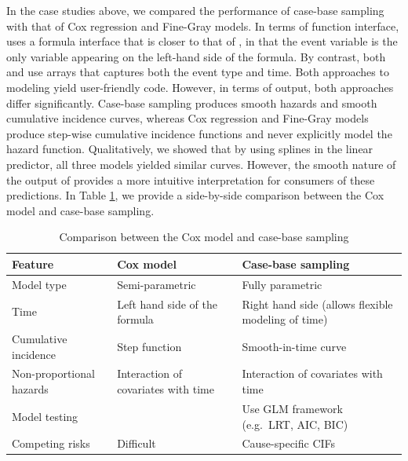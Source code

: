 \documentclass[
]{jss}
\begin{document}
In the case studies above, we compared the performance of case-base
sampling with that of Cox regression and Fine-Gray models. In terms of
function interface,  uses a formula interface that is
closer to that of , in that the event variable is the only
variable appearing on the left-hand side of the formula. By contrast,
both  and  use arrays
that captures both the event type and time. Both approaches to modeling
yield user-friendly code. However, in terms of output, both approaches
differ significantly. Case-base sampling produces smooth hazards and
smooth cumulative incidence curves, whereas Cox regression and Fine-Gray
models produce step-wise cumulative incidence functions and never
explicitly model the hazard function. Qualitatively, we showed that by
using splines in the linear predictor, all three models yielded similar
curves. However, the smooth nature of the output of 
provides a more intuitive interpretation for consumers of these
predictions. In Table \ref{tab:compCBvsCox}, we provide a side-by-side
comparison between the Cox model and case-base sampling.

\begin{table}
\caption{\label{tab:compCBvsCox}Comparison between the Cox model and case-base sampling}
\centering
\begin{tabular}[t]{llp{5cm}}
\toprule
Feature & Cox model & Case-base sampling\\
\midrule
Model type & Semi-parametric & Fully parametric\\
Time & Left hand side of the formula & Right hand side (allows flexible modeling of time)\\
Cumulative incidence & Step function & Smooth-in-time curve\\
Non-proportional hazards & Interaction of covariates with time & Interaction of covariates with time\\
Model testing &  & Use GLM framework \newline (e.g.\ LRT, AIC, BIC)\\
\addlinespace
Competing risks & Difficult & Cause-specific CIFs\\
\bottomrule
\end{tabular}
\end{table}
\end{document}
